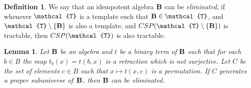 \documentclass[11pt]{amsart}
\newcommand{\m}[1]{{\uppercase {\mathbf {#1}}}}
\newcommand{\vr}[1]{{\uppercase {\mathcal{#1}}}}
\newtheorem{lm}[thm]{Lemma}
\theoremstyle{definition}
\newtheorem{df}[thm]{Definition}
\begin{document}
\begin{df}\label{defeliminated}
We say that an idempotent algebra $\m b$ can be {\em eliminated}, if whenever 
$\vr t$ is a template such that $\m B\in\vr t$, and $\vr t\setminus\{\m B\}$ is also a template, and $CSP(\vr t\setminus\{\m B\})$ is tractable, then $CSP(\vr t)$ is also tractable.
\end{df}

\begin{lm}
\label{l:withC}
Let $\m B$ be an algebra and $t$ be a binary term 
of $\m B$ such that for each $b\in B$ the map $t_b(x) = t(b,x)$ is a retraction which is not surjective.
Let $C$ be the set of elements $c\in B$ such that $x\mapsto t(x,c)$ is a permutation. If $C$ generates a proper subuniverse of~$\m B$, then
$\m B$ can be eliminated.
\end{lm}
\end{document}
